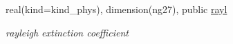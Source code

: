 \begin{Indent}
\begin{DoxyCompactItemize}
real(kind=kind\+\_\+phys), dimension(ng27), public \hyperlink{group__module__radsw__kgbnn_gaca4c6e06d1cd46568048a035c6726f1d}{rayl}
\begin{DoxyCompactList}\small\item\em rayleigh extinction coefficient \end{DoxyCompactList}\end{DoxyCompactItemize}
\end{Indent}
